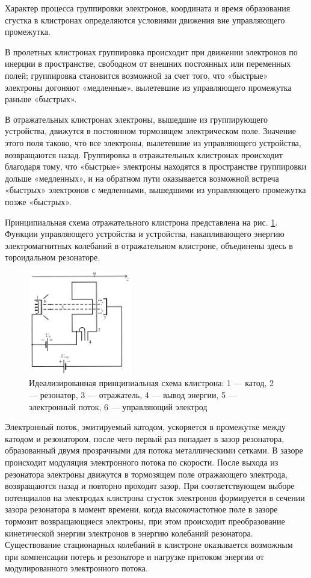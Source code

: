 Характер процесса группировки электронов, координата и время образования сгустка в клистронах определяются условиями движения вне управляющего промежутка.

В пролетных клистронах группировка происходит при движении электронов по инерции в пространстве, свободном от внешних постоянных или переменных полей; группировка становится возможной за счет того, что «быстрые» электроны догоняют «медленные», вылетевшие из управляюще­го промежутка раньше «быстрых».

В отражательных клистронах электроны, вышедшие из группирующего устройства, движутся в постоянном тормозящем электрическом поле. Значение этого поля таково, что все электроны, вылетевшие из управляющего устройства, возвращаются назад. Группировка в отражательных клистронах происходит благодаря тому, что «быстрые» электроны находятся в пространстве группировки дольше «медленных», и на обратном пути оказывается возможной встреча «быстрых» электронов с медленными, вышедшими из управляющего промежутка позже «быстрых».

Принципиальная схема отражательного клистрона представлена на рис. \ref{fig:1}. Функции управляющего устройства и устройства, накапливающего энергию электромагнитных колебаний в отражательном клистроне, объединены здесь в тороидальном резонаторе.

\begin{figure}[h!]
	\centering
	\includegraphics[width=0.4\textwidth]{text/fig1}
	\caption{Идеализированная принципиальная схема клистрона: 1 — катод, 2 — резонатор, 3 — отражатель, 4 — вывод энергии, 5 — электронный поток, 6 — управляющий электрод}
	\label{fig:1}
\end{figure}

Электронный поток, эмитируемый катодом, ускоряется в промежутке между катодом и резонатором, после чего первый раз попадает в зазор резонатора, образованный двумя прозрачными для потока металлическими сетками. В зазоре происходит модуляция электронного потока по скорости. После выхода из резонатора электроны движутся в тормозящем поле отражающего электрода, возвращаются назад и повторно проходят зазор. При соответствующем выборе потенциалов на электродах клистрона сгусток электронов формируется в сечении зазора резонатора в момент времени, когда высокочастотное поле в зазоре тормозит возвращающиеся электроны, при этом происходит преобразование кинетической энергии электронов в энергию колебаний резонатора. Существование стационарных колебаний в клистроне оказывается возможным при компенсации потерь и резонаторе и нагрузке притоком энергии от модулированного электронного потока.

